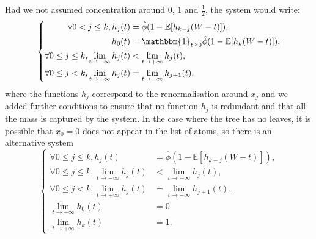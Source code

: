 \documentclass[11pt]{article}
\begin{document}
\begin{remark}
Had we not assumed concentration around $0$, $1$ and $\frac{1}{2}$, the system would write:
\begin{equation}\label{eq:systemzoomh0singular}
\left\{
\begin{aligned}
    \forall 0 < j \leq k, h_j(t)&= \hat{\phi}(1-\mathbb{E}[h_{{k-j}}(W-t)]), \\
    h_0(t)&= \mathbbm{1}_{t \geq 0} \hat{\phi}(1-\mathbb{E}[h_{k}(W-t)]),\\
    \forall 0 \leq j \leq k, \lim_{t \rightarrow -\infty} h_j(t) &< \lim_{t \rightarrow + \infty}h_j(t),  \\
    \forall 0 \leq j < k, \lim_{t \rightarrow + \infty}h_j(t) &= \lim_{t \rightarrow -\infty}h_{j+1}(t), 
\end{aligned}
\right.
\end{equation}
where the functions $h_j$ correspond to the renormalisation around $x_j$ and we added further conditions to ensure that no function $h_j$ is redundant and that all the mass is captured by the system.
    In the case where the tree has no leaves, it is possible that $x_0=0$ does not appear in the list of atoms, so there is an alternative system 
\begin{equation}\label{eq:systemzoomh1/2singular}
\left\{
\begin{aligned}
    \forall 0 \leq j \leq k, h_j(t)&= \hat{\phi}(1-\mathbb{E}[h_{{k-j}}(W-t)]), \\
    \forall 0 \leq j \leq k, \lim_{t \rightarrow -\infty} h_j(t) &< \lim_{t \rightarrow + \infty}h_j(t),  \\
    \forall 0 \leq j < k, \lim_{t \rightarrow + \infty}h_j(t) &= \lim_{t \rightarrow -\infty}h_{j+1}(t), \\
    \lim_{t \rightarrow -\infty} h_0(t)&= 0 \\
    \lim_{t \rightarrow +\infty} h_k(t)&=1.
\end{aligned}
\right.
\end{equation}\end{remark}
\end{document}
